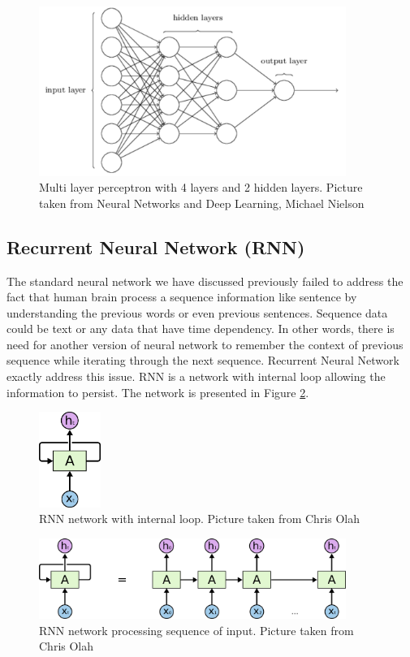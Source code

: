 \begin{figure}[t!]
    \centering
    \includegraphics[width=10cm]{pic/ch-review/mlp.png}
    \caption{Multi layer perceptron with 4 layers and 2 hidden layers. Picture taken from Neural Networks and Deep Learning, Michael Nielson}
    \label{fig:mlp}
\end{figure}

\subsection{Recurrent Neural Network (RNN)}
The standard neural network we have discussed previously failed to address the fact that human brain process a sequence information like sentence by understanding the previous words or even previous sentences. Sequence data could be text or any data that have time dependency. In other words, there is need for another version of neural network to remember the context of previous sequence while iterating through the next sequence. Recurrent Neural Network exactly address this issue. RNN is a network with internal loop allowing the information to persist. The network is presented in Figure \ref{fig:rnn-rolled}.

\begin{figure}[t!]
    \centering
    \includegraphics[width=2cm]{pic/ch-review/RNN-rolled.png}
    \caption{RNN network with internal loop. Picture taken from Chris Olah}
    \label{fig:rnn-rolled}
\end{figure}

\begin{figure}[t!]
    \centering
    \includegraphics[width=10cm]{pic/ch-review/RNN-unrolled.png}
    \caption{RNN network processing sequence of input. Picture taken from Chris Olah}
    \label{fig:rnn-unrolled}
\end{figure}

